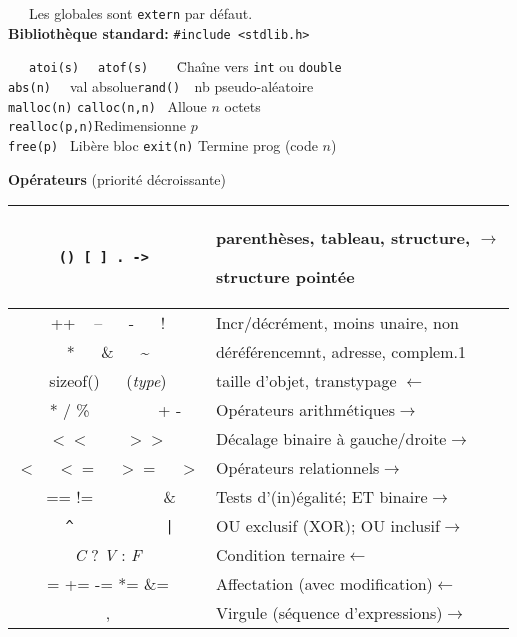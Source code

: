 \documentclass[a4paper,10pt,landscape]{article}
\newcommand{\Subsection}[1]{{\textbf{#1}}}
\begin{document}
\begin{minipage}{1.0\linewidth}
\begin{multicols}{3}
  ~~~Les globales sont \verb=extern= par défaut.\\[-.5\baselineskip]

  \textbf{Bibliothèque standard:} \verb=#include <stdlib.h>= \vspace{-.6\baselineskip}
  \begin{tabbing}
    ~~~\=\verb=atoi(s)  = \=\verb=atof(s)    =\=Chaîne vers \verb=int= ou \verb=double=\\
    \>\verb=abs(n)  = val absolue\>\>\verb=rand()  =nb pseudo-aléatoire\\
    \>\verb=malloc(n)= \>\verb=calloc(n,n)= \>~Alloue $n$ octets\\
    \>\verb=realloc(p,n)=\>\>Redimensionne $p$\\
    \>\verb=free(p) = Libère bloc 
    \>\>\verb=exit(n)= Termine prog (code $n$)
  \end{tabbing}
  \columnbreak %

  \Subsection{Opérateurs} (priorité décroissante)
  
  \begin{tabular}{|c|c| p{53.5mm}|}\hline
    \multicolumn{2}{|c|}{\tt ()  [ ]  .  -> }
    & parenthèses, tableau, structure, \hfill$\rightarrow$\par
      structure pointée\\\hline
    \multicolumn{2}{|c|}{++ ~ -- ~~  - ~~ !}&Incr/décrément, moins unaire, non\\
    \multicolumn{2}{|c|}{* ~~ \& ~~ \~}&déréférencemnt, adresse,
                                         complem.1$\!\!$\\
    \multicolumn{2}{|c|}{sizeof() ~~  (\textit{type})}&
     taille d'objet, transtypage \hfill$\leftarrow$\\\hline
    * / \% & + - & Opérateurs arithmétiques\hfill$\rightarrow$ \\\hline
    \multicolumn{2}{|c|}{$<<$ ~~~ $>>$} &Décalage binaire à gauche/droite\hfill$\rightarrow$\\\hline
    \multicolumn{2}{|c|}{$<$ ~ $<=$ ~ $>=$ ~ $>$} &Opérateurs relationnels\hfill$\rightarrow$\\\hline
    ==  != &  \& & Tests d'(in)égalité; ET binaire\hfill$\rightarrow$\\\hline
    \verb=^= & \verb=|= & OU exclusif (XOR); OU inclusif\hfill$\rightarrow$\\\hline
    \multicolumn{2}{|c|}{\textit{C} ? \textit{V} : \textit{F}}&
        Condition ternaire\hfill$\leftarrow$\\\hline
    \multicolumn{2}{|c|}{=  += -= *= \&= }&
        Affectation (avec modification)\hfill$\leftarrow$\\\hline
    \multicolumn{2}{|c|}{,}& Virgule (séquence d'expressions)\hfill$\rightarrow$\\\hline
  \end{tabular}


\end{multicols}
\end{minipage}
\end{document}
